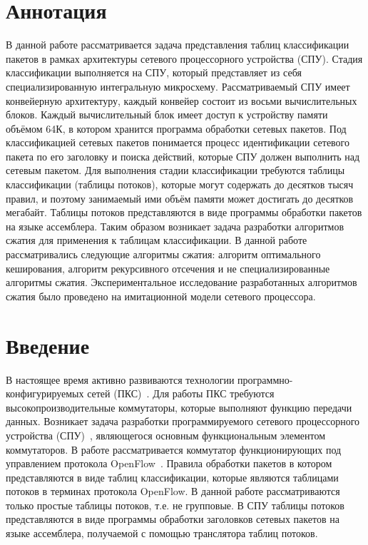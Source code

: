 \documentclass[oneside,final,12pt]{extarticle}
\begin{document}

    \section*{Аннотация}
        В данной работе рассматривается задача представления таблиц классификации пакетов в рамках архитектуры сетевого процессорного устройства (СПУ).
        Стадия классификации выполняется на СПУ, который представляет из себя специализированную интегральную микросхему. Рассматриваемый СПУ имеет
        конвейерную архитектуру, каждый конвейер состоит из восьми вычислительных блоков. Каждый вычислительный блок имеет доступ к устройству памяти объёмом 64К, 
        в котором хранится программа обработки сетевых пакетов. 
        Под классификацией сетевых пакетов понимается процесс идентификации сетевого пакета по его заголовку и поиска действий, которые СПУ должен выполнить над сетевым пакетом.
        Для выполнения стадии классификации требуются таблицы классификации (таблицы потоков), 
        которые могут содержать до десятков тысяч правил, и поэтому занимаемый ими объём памяти может достигать до десятков мегабайт. 
        Таблицы потоков представляются в виде программы обработки пакетов на языке ассемблера. 
        Таким образом возникает задача разработки алгоритмов сжатия для применения к таблицам классификации. 
        В данной работе рассматривались следующие алгоритмы сжатия: 
        алгоритм оптимального кеширования, алгоритм рекурсивного отсечения и не специализированные алгоритмы сжатия. 
        Экспериментальное исследование разработанных алгоритмов сжатия было проведено на имитационной модели сетевого процессора.
    \newpage
    \tableofcontents
    \newpage

    \section*{Введение}
        В настоящее время активно развиваются технологии программно-конфигурируемых 
        сетей (ПКС)~\cite{smel_sdn}. Для работы ПКС требуются высокопроизводительные коммутаторы, 
        которые выполняют функцию передачи данных. Возникает задача разработки программируемого 
        сетевого процессорного устройства (СПУ)~\cite{scenarios}, являющегося основным 
        функциональным элементом коммутаторов. В работе рассматривается коммутатор 
        функционирующих под управлением протокола OpenFlow~\cite{openflow}. Правила обработки пакетов 
        в котором представляются в виде таблиц классификации, которые являются таблицами потоков в терминах протокола OpenFlow.
        В данной работе рассматриваются только простые таблицы потоков, т.е. не групповые. 
        В СПУ таблицы потоков представляются в виде программы обработки заголовков сетевых пакетов на языке ассемблера,
        получаемой с помощью транслятора таблиц потоков.
\end{document}
